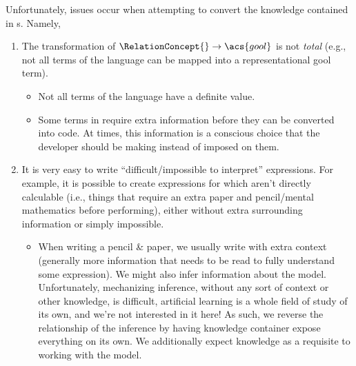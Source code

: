 
Unfortunately, issues occur when attempting to convert the knowledge contained
in \RelationConcept{}s. Namely,

\begin{enumerate}

	\item The transformation of \(\RelationConcept{} \rightarrow \acs{gool}\) is
	      not \textit{total} (e.g., not all terms of the \Expr{} language can be
	      mapped into a representational \acs{gool} term).

	      \begin{itemize}

		      \item Not all terms of the \Expr{} language have a definite value.

		      \item Some terms in \Expr{} require extra information before they
		            can be converted into code. At times, this information is a
		            conscious choice that the developer should be making instead
		            of imposed on them.

	      \end{itemize}

	\item It is very easy to write ``difficult/impossible to interpret''
	      expressions. For example, it is possible to create expressions for
	      which aren't directly calculable (i.e., things that require an extra
	      paper and pencil/mental mathematics before performing), either without
	      extra surrounding information or simply impossible.

	      \begin{itemize}

		      \item When writing a pencil \& paper, we usually write with extra
		            context (generally more information that needs to be read to
		            fully understand some expression). We might also infer
		            information about the model. Unfortunately, mechanizing
		            inference, without any sort of context or other knowledge,
		            is difficult, artificial learning is a whole field of study
		            of its own, and we're not interested in it here! As such, we
		            reverse the relationship of the inference by having
		            knowledge container expose everything on its own. We
		            additionally expect knowledge as a requisite to working with
		            the model.


\end{itemize}
\end{enumerate}
